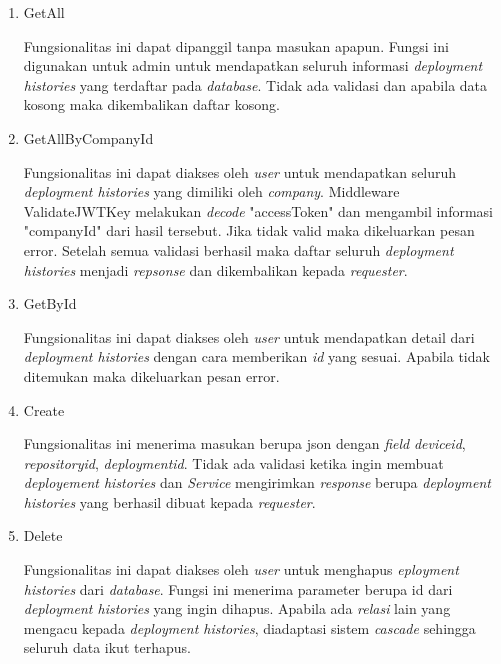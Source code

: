 \begin{enumerate}
  \item GetAll

        Fungsionalitas ini dapat dipanggil tanpa masukan apapun. Fungsi ini digunakan untuk admin untuk mendapatkan seluruh informasi \textit{deployment histories} yang terdaftar pada \textit{database}. Tidak ada validasi dan apabila data kosong maka dikembalikan daftar kosong.

  \item GetAllByCompanyId

        Fungsionalitas ini dapat diakses oleh \textit{user} untuk mendapatkan seluruh \textit{deployment histories} yang dimiliki oleh \textit{company}. Middleware ValidateJWTKey melakukan \textit{decode} "accessToken" dan mengambil informasi "companyId" dari hasil tersebut. Jika tidak valid maka dikeluarkan pesan error. Setelah semua validasi berhasil maka daftar seluruh \textit{deployment histories} menjadi \textit{repsonse} dan dikembalikan kepada \textit{requester}.

  \item GetById

        Fungsionalitas ini dapat diakses oleh \textit{user} untuk mendapatkan detail dari \textit{deployment histories} dengan cara memberikan \textit{id} yang sesuai. Apabila tidak ditemukan maka dikeluarkan pesan error.

  \item Create

        Fungsionalitas ini menerima masukan berupa json dengan \textit{field} \textit{device\textunderscore id}, \textit{repository\textunderscore id}, \textit{deployment\textunderscore id}. Tidak ada validasi ketika ingin membuat \textit{deployement histories} dan \textit{Service} mengirimkan \textit{response} berupa \textit{deployment histories} yang berhasil dibuat kepada \textit{requester}.

  \item Delete

        Fungsionalitas ini dapat diakses oleh \textit{user} untuk menghapus \textit{eployment histories} dari \textit{database}. Fungsi ini menerima parameter berupa id dari \textit{deployment histories} yang ingin dihapus. Apabila ada \textit{relasi} lain yang mengacu kepada \textit{deployment histories}, diadaptasi sistem \textit{cascade} sehingga seluruh data ikut terhapus.

\end{enumerate}

